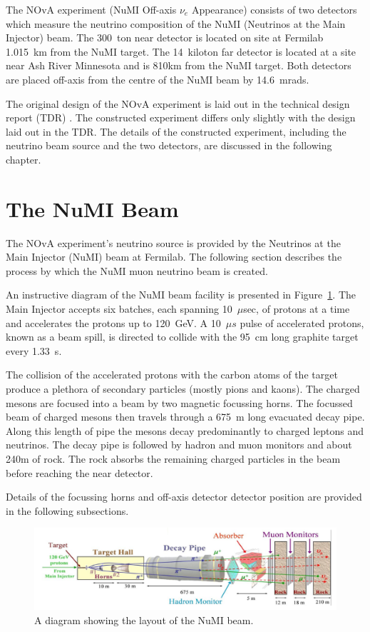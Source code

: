 
The NOvA experiment (NuMI Off-axis $\nu_e$ Appearance) consists of two
detectors which measure the neutrino composition of the NuMI
(Neutrinos at the Main Injector) beam. The
300~ton near detector is located on site at Fermilab 1.015~km 
from the NuMI
target. The 14~kiloton far detector is located at a site near Ash
River Minnesota and is 810km from the
NuMI target. Both detectors are placed off-axis from the centre
of the NuMI beam by 14.6~mrads.

The original design of the NOvA experiment is laid out in the
technical design report (TDR) \cite{TDR}. The constructed experiment
differs only slightly with the design laid out in the TDR. The details
of the constructed experiment, including the neutrino beam source and
the two detectors, are discussed in the following chapter.


\section{The NuMI Beam}

The NOvA experiment's neutrino source is provided by the Neutrinos at
the Main Injector (NuMI) beam at Fermilab. The following section
describes the process by which the NuMI muon neutrino beam is created.

An instructive diagram of the NuMI beam facility is presented in
Figure~\ref{fig:NuMI}.
The Main Injector accepts six batches, each spanning 10~$\mu$sec, of
protons at a time and accelerates the protons up to 120~GeV. A 10~$\mu
s$ pulse of accelerated protons, known as a beam spill, is directed to
collide with the 95~cm long graphite target every 1.33~s. 

The collision of the accelerated protons with the carbon atoms of the
target produce a plethora of secondary particles (mostly pions and
kaons). The charged
mesons are focused into a beam by two magnetic focussing horns. 
The focussed beam of charged mesons then travels through a 675~m long
evacuated decay pipe. Along this length of pipe the mesons decay
predominantly to charged leptons and neutrinos. 
The decay pipe is followed by hadron and muon
monitors and about 240m of rock. The rock absorbs the remaining charged
particles in the beam before reaching the near detector.

Details of the focussing horns and off-axis detector detector position
are provided in the following subsections.

\begin{figure}
  \centering
  \includegraphics[width=1\textwidth]{../../img/beam/beam_diagram.png}
  \caption{A diagram showing the layout of the NuMI beam.}
  \label{fig:NuMI}
\end{figure}

